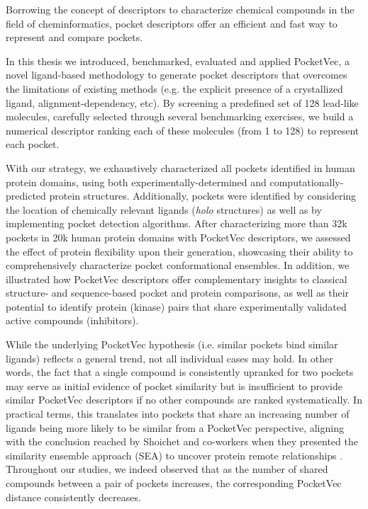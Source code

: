 Borrowing the concept of descriptors to characterize chemical compounds in the field of cheminformatics, pocket descriptors offer an efficient and fast way to represent and compare pockets. 

In this thesis we introduced, benchmarked, evaluated and applied PocketVec, a novel ligand-based methodology to generate pocket descriptors that overcomes the limitations of existing methods (e.g. the explicit presence of a crystallized ligand, alignment-dependency, etc). By screening a predefined set of 128 lead-like molecules, carefully selected through several benchmarking exercises, we build a numerical descriptor ranking each of these molecules (from 1 to 128) to represent each pocket.

With our strategy, we exhaustively characterized all pockets identified in human protein domains, using both experimentally-determined and computationally-predicted protein structures. Additionally, pockets were identified by considering the location of chemically relevant ligands (\textit{holo} structures) as well as by implementing pocket detection algorithms. After characterizing more than 32k pockets in 20k human protein domains with PocketVec descriptors, we assessed the effect of protein flexibility upon their generation, showcasing their ability to comprehensively characterize pocket conformational ensembles. In addition, we illustrated how PocketVec descriptors offer complementary insights to classical structure- and sequence-based pocket and protein comparisons, as well as their potential to identify protein (kinase) pairs that share experimentally validated active compounds (inhibitors).

While the underlying PocketVec hypothesis (i.e. similar pockets bind similar ligands) reflects a general trend, not all individual cases may hold. In other words, the fact that a single compound is consistently upranked for two pockets may serve as initial evidence of pocket similarity but is insufficient to provide similar PocketVec descriptors if no other compounds are ranked systematically. In practical terms, this translates into pockets that share an increasing number of ligands being more likely to be similar from a PocketVec perspective, aligning with the conclusion reached by Shoichet and co-workers when they presented the similarity ensemble approach (SEA) to uncover protein remote relationships \cite{keiser_relating_2007}. Throughout our studies, we indeed observed that as the number of shared compounds between a pair of pockets increases, the corresponding PocketVec distance consistently decreases. 

